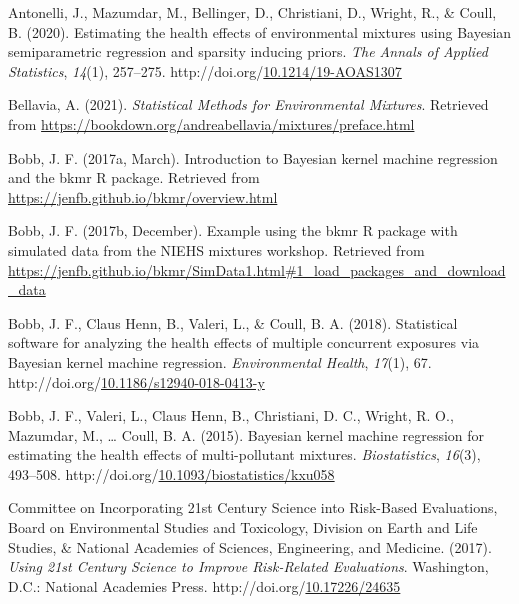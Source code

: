 \documentclass[12pt, twoside]{amherstthesis}
\newenvironment{CSLReferences}[2]%
  {}%
  {\par}
\begin{document}
\hypertarget{refs}{}
\begin{CSLReferences}{1}{0}
\leavevmode{}%
Antonelli, J., Mazumdar, M., Bellinger, D., Christiani, D., Wright, R., \& Coull, B. (2020). Estimating the health effects of environmental mixtures using {Bayesian} semiparametric regression and sparsity inducing priors. \emph{The Annals of Applied Statistics}, \emph{14}(1), 257--275. http://doi.org/\href{https://doi.org/10.1214/19-AOAS1307}{10.1214/19-AOAS1307}

\leavevmode{}%
Bellavia, A. (2021). \emph{Statistical {Methods} for {Environmental} {Mixtures}}. Retrieved from \url{https://bookdown.org/andreabellavia/mixtures/preface.html}

\leavevmode{}%
Bobb, J. F. (2017a, March). Introduction to {Bayesian} kernel machine regression and the bkmr {R} package. Retrieved from \url{https://jenfb.github.io/bkmr/overview.html}

\leavevmode{}%
Bobb, J. F. (2017b, December). Example using the bkmr {R} package with simulated data from the {NIEHS} mixtures workshop. Retrieved from \url{https://jenfb.github.io/bkmr/SimData1.html\#1_load_packages_and_download_data}

\leavevmode{}%
Bobb, J. F., Claus Henn, B., Valeri, L., \& Coull, B. A. (2018). Statistical software for analyzing the health effects of multiple concurrent exposures via {Bayesian} kernel machine regression. \emph{Environmental Health}, \emph{17}(1), 67. http://doi.org/\href{https://doi.org/10.1186/s12940-018-0413-y}{10.1186/s12940-018-0413-y}

\leavevmode{}%
Bobb, J. F., Valeri, L., Claus Henn, B., Christiani, D. C., Wright, R. O., Mazumdar, M., \ldots{} Coull, B. A. (2015). Bayesian kernel machine regression for estimating the health effects of multi-pollutant mixtures. \emph{Biostatistics}, \emph{16}(3), 493--508. http://doi.org/\href{https://doi.org/10.1093/biostatistics/kxu058}{10.1093/biostatistics/kxu058}

\leavevmode{}%
Committee on Incorporating 21st Century Science into Risk-Based Evaluations, Board on Environmental Studies and Toxicology, Division on Earth and Life Studies, \& National Academies of Sciences, Engineering, and Medicine. (2017). \emph{Using 21st {Century} {Science} to {Improve} {Risk}-{Related} {Evaluations}}. Washington, D.C.: National Academies Press. http://doi.org/\href{https://doi.org/10.17226/24635}{10.17226/24635}


\end{CSLReferences}
\end{document}
